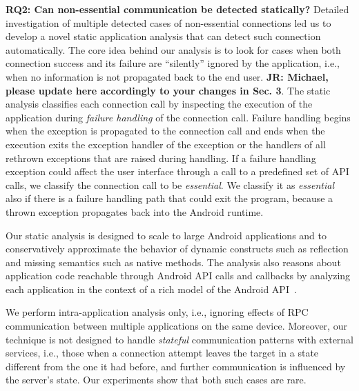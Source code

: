 \noindent 
{\bf RQ2: Can non-essential communication be detected statically?}
Detailed investigation of multiple detected cases of non-essential connections led us to develop a novel static application
analysis that can detect such connection automatically. 
The core idea behind our analysis is to look for cases when both connection success and its failure 
are ``silently''
ignored by the application, i.e., when no information is not propagated back to the end user.
{\bf JR: Michael, please update here accordingly to your changes in Sec. 3}.
  The static analysis
classifies each connection call by inspecting the execution of the
application during {\it failure handling} of the connection call.
Failure handling begins when the exception is propagated to the
connection call and ends when the execution exits the exception
handler of the exception or the handlers of all rethrown exceptions
that are raised during handling.
If a failure handling exception could affect the user interface
through a call to a predefined set of API calls, we classify the
connection call to be {\em essential}.  We classify it as {\em essential}
also if there is a failure handling
path that could exit the program, because a thrown exception
propagates back into the Android runtime.

Our static analysis is designed to scale to large Android applications
and to conservatively approximate the behavior of dynamic constructs
such as reflection and missing semantics such as native methods.  The
analysis also reasons about application code reachable through Android
API calls and callbacks by analyzing each application in the context
of a rich model of the Android
API~\cite{Gordon:Kim:Perkins:Gilham:Nguyen:Rinard:NDSS15}. 

We perform intra-application analysis only, i.e., ignoring effects of RPC communication between multiple applications on the same device. Moreover, our technique is not designed to handle
\emph{stateful} communication patterns with external services, i.e., those when a connection attempt leaves the target in a state different from the one it had before, and further communication is influenced by the server's state. Our experiments show that both such cases are rare. 

